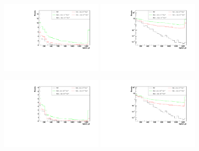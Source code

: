 \begin{figure}[h]
  \begin{center}
	\includegraphics[width=0.45\textwidth]{Plots/aQGC_kinematics/lepton_pt_FM1.pdf}%
	\includegraphics[width=0.45\textwidth]{Plots/aQGC_kinematics/lepton_pt_FM1_log.pdf}\\				
    \caption{}
  \end{center}
\end{figure}

\begin{figure}[h]
  \begin{center}
	\includegraphics[width=0.45\textwidth]{Plots/aQGC_kinematics/lepton_pt_FM6.pdf}%
	\includegraphics[width=0.45\textwidth]{Plots/aQGC_kinematics/lepton_pt_FM6_log.pdf}\\				
    \caption{}
  \end{center}
\end{figure}

